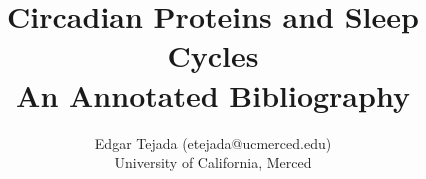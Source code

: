 \documentclass [12pt]{article}
\title{Circadian Proteins and Sleep Cycles\\\medskip An Annotated Bibliography}
\author{Edgar Tejada (etejada@ucmerced.edu)\\University of California, Merced}
\begin{document}
\maketitle

\nocite{*}


%
%
%


%
%
%
%
%
%
%
\end{document}
